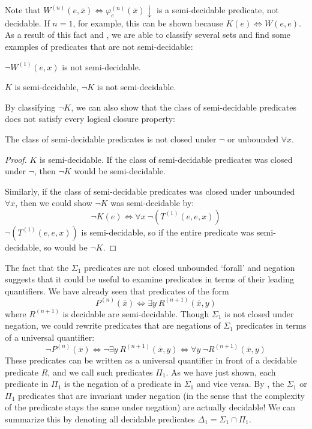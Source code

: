 Note that $W^{(n)}(e, \overline{x}) \iff \varphi_e^{(n)}(\overline{x}) \downarrow$ is a semi-decidable predicate, not decidable. If $n=1$, for example, this can be shown because $K(e) \iff W(e, e)$. As a result of this fact and , we are able to classify several sets and find some examples of predicates that are not semi-decidable:
\begin{corollary}
$\lnot W^{(1)}(e, x)$ is not semi-decidable.
\end{corollary}
\begin{corollary}
$K$ is semi-decidable, $\lnot K$ is not semi-decidable.
\end{corollary}
By classifying $\lnot K$, we can also show that the class of semi-decidable predicates does not satisfy every logical closure property:
\begin{corollary}
The class of semi-decidable predicates is not closed under $\lnot$ or unbounded $\forall x$.
\end{corollary}
\begin{proof}
$K$ is semi-decidable. If the class of semi-decidable predicates was closed under $\lnot$, then $\lnot K$ would be semi-decidable.

Similarly, if the class of semi-decidable predicates was closed under unbounded $\forall x$, then we could show $\lnot K$ was semi-decidable by: \[
    \lnot K(e) \iff \forall x \ \lnot \left(T^{(1)}(e, e, x)\right)
\]
$\lnot \left(T^{(1)}(e, e, x)\right)$ is semi-decidable, so if the entire predicate was semi-decidable, so would be $\lnot K$.
\end{proof}

The fact that the $\Sigma_1$ predicates are not closed unbounded `forall' and negation suggests that it could be useful to examine predicates in terms of their leading quantifiers. We have already seen that predicates of the form \[
    P^{(n)}(\overline{x}) \iff \exists y \ R^{(n+1)}(\overline{x}, y)
\]
where $R^{(n+1)}$ is decidable are semi-decidable. Though $\Sigma_1$ is not closed under negation, we could rewrite predicates that are negations of $\Sigma_1$ predicates in terms of a universal quantifier: \[
    \lnot P^{(n)}(\overline{x}) \iff \lnot \exists y \ R^{(n+1)}(\overline{x}, y) \iff \forall y \ \lnot R^{(n+1)}(\overline{x}, y)
\]
These predicates can be written as a universal quantifier in front of a decidable predicate $R$, and we call such predicates $\Pi_1$. As we have just shown, each predicate in $\Pi_1$ is the negation of a predicate in $\Sigma_1$ and vice versa. By , the $\Sigma_1$ or $\Pi_1$ predicates that are invariant under negation (in the sense that the complexity of the predicate stays the same under negation) are actually decidable! We can summarize this by denoting all decidable predicates $\Delta_1 = \Sigma_1 \cap \Pi_1$.

